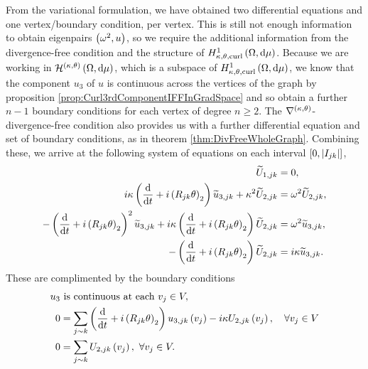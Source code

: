 From the variational formulation, we have obtained two differential equations and one vertex/boundary condition, per vertex.
This is still not enough information to obtain eigenpairs $\left( \omega^2, u \right)$, so we require the additional information from the divergence-free condition and the structure of $H^1_{\kappa,\theta,\mathrm{curl}}\left( \Omega, \mathrm{d}\mu \right)$.
Because we are working in $\mathcal{H}^{\left( \kappa, \theta \right)}\left( \Omega, \mathrm{d}\mu \right)$, which is a subspace of $H^1_{\kappa,\theta,\mathrm{curl}}\left( \Omega, \mathrm{d}\mu \right)$, we know that the component $u_3$ of $u$ is continuous across the vertices of the graph by proposition \ref{prop:Curl3rdComponentIFFInGradSpace} and so obtain a further $n-1$ boundary conditions for each vertex of degree $n\geq2$.
The $\nabla^{\left( \kappa, \theta \right)}$-divergence-free condition also provides us with a further differential equation and set of boundary conditions, as in theorem \ref{thm:DivFreeWholeGraph}.
Combining these, we arrive at the following system of equations on each interval $\left[ 0,\left\lvert I_{jk} \right\rvert \right]$,
\begin{subequations} \label{eq:CurlEdgeEquations}
	\begin{align}
		\widetilde{U}_{1,jk} &= 0, \\
		i\kappa\left( \dfrac{\mathrm{d}}{\mathrm{d}t} + i\left( R_{jk}\theta \right)_2 \right)\widetilde{u}_{3,jk} + \kappa^2\widetilde{U}_{2,jk} &= \omega^2 \widetilde{U}_{2,jk}, \label{eq:CurlEdgeEquations1} \\
		-\left( \dfrac{\mathrm{d}}{\mathrm{d}t} + i\left( R_{jk}\theta \right)_2 \right)^2\widetilde{u}_{3,jk} + i\kappa\left( \dfrac{\mathrm{d}}{\mathrm{d}t} + i\left( R_{jk}\theta \right)_2 \right)\widetilde{U}_{2,jk} &= \omega^2\widetilde{u}_{3,jk}, \label{eq:CurlEdgeEquations2} \\
		-\left( \dfrac{\mathrm{d}}{\mathrm{d}t} + i\left( R_{jk}\theta \right)_2 \right)\widetilde{U}_{2,jk} &= i\kappa\widetilde{u}_{3,jk}. \label{eq:CurlEdgeEquations3}
	\end{align}
\end{subequations}
These are complimented by the boundary conditions
\begin{subequations} \label{eq:CurlVertexConditions}
	\begin{align}
		u_3 &\text{ is continuous at each } v_j\in V, \label{eq:CurlVertexConditionsCty}\\
		0 &= \sum_{j\sim k} \left( \dfrac{\mathrm{d}}{\mathrm{d}t} + i\left( R_{jk}\theta \right)_2 \right)u_{3,jk}\left( v_j \right) - i\kappa U_{2,jk}\left( v_j \right), \quad\forall v_j\in V \label{eq:CurlVertexConditionsSumDeriv}\\
		0 &= \sum_{j\sim k}U_{2,jk}\left( v_j \right), \ \forall v_j\in V. \label{eq:CurlVertexConditionsSum2}
	\end{align}
\end{subequations}
